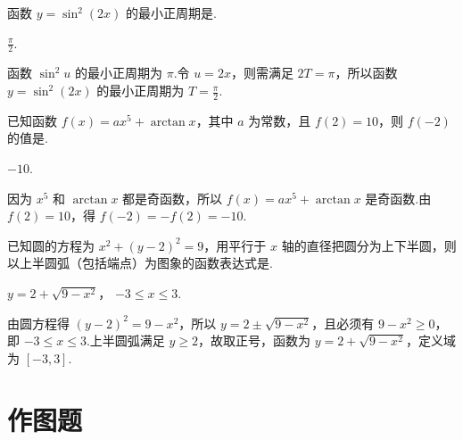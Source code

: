 \documentclass[UTF8,a4paper,oneside,11pt]{ctexbook}
\begin{document}
\begin{problem}

函数 \(y = \sin^2(2x) \) 的最小正周期是\fillinblank{}.
\end{problem}

\begin{answer}
\(\displaystyle \frac{\pi}{2}\).
\end{answer}

\begin{solution}
函数 \(\sin^{2}u\) 的最小正周期为 \(\pi\).令 \(u=2x\)，则需满足 \(2T=\pi\)，所以函数 \(y=\sin^{2}(2x)\) 的最小正周期为 \(\displaystyle T=\frac\pi2\).
\end{solution}

\begin{problem}

已知函数 \(f(x) = ax^5 + \arctan x \)，其中 \(a \) 为常数，且 \(f(2) = 10 \)，则 \(f(-2) \) 的值是\fillinblank{}.
\end{problem}

\begin{answer}
\(-10\).
\end{answer}

\begin{solution}
因为 \(x^{5}\) 和 \(\arctan x\) 都是奇函数，所以 \(f(x)=ax^{5}+\arctan x\) 是奇函数.由 \(f(2)=10\)，得 \(f(-2)=-f(2)=-10\).
\end{solution}

\begin{problem}

已知圆的方程为 \(x^2 + (y - 2)^2 = 9 \)，用平行于 \(x \) 轴的直径把圆分为上下半圆，则以上半圆弧（包括端点）为图象的函数表达式是\fillinblank{}.
\end{problem}

\begin{answer}
\(y=2+\sqrt{9-x^{2}}\)， \( -3\leqslant x\leqslant 3\).
\end{answer}

\begin{solution}
由圆方程得 \((y-2)^{2}=9-x^{2}\)，所以 \(y=2\pm\sqrt{9-x^{2}}\)，且必须有 \(9-x^{2}\geqslant0\)，即 \(-3\leqslant x\leqslant3\).上半圆弧满足 \(y\geqslant2\)，故取正号，函数为 \(y=2+\sqrt{9-x^{2}}\)，定义域为 \([-3,3]\).
\end{solution}

\section{作图题}
\end{document}
